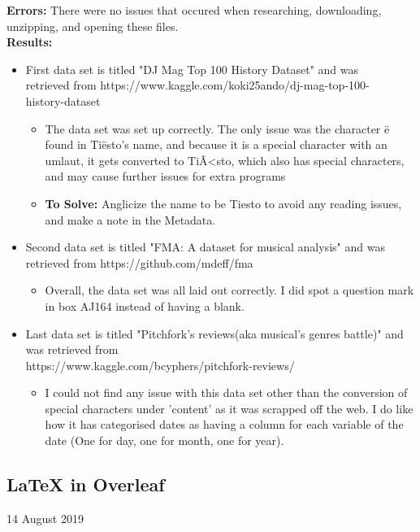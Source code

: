 \documentclass{article}
\begin{document}
\textbf{Errors:} There were no issues that occured when researching, downloading, unzipping, and opening these files. \\
\textbf{Results:}
\begin{itemize}
    \item First data set is titled "DJ Mag Top 100 History Dataset" and was \\ retrieved from https://www.kaggle.com/koki25ando/dj-mag-top-100-\\history-dataset
    \begin{itemize}
        \item  The data set was set up correctly. The only issue was the character ë found in Tiësto's name, and because it is a special character with an umlaut, it gets converted to TiÃ<sto, which also has special characters, and may cause further issues for extra programs
        \item \textbf{To Solve:} Anglicize the name to be Tiesto to avoid any reading issues, and make a note in the Metadata.
    \end{itemize}
    \item Second data set is titled "FMA: A dataset for musical analysis" and was retrieved from https://github.com/mdeff/fma
    \begin{itemize}
        \item Overall, the data set was all laid out correctly. I did spot a question mark in box AJ164 instead of having a blank.
    \end{itemize}
    \item Last data set is titled "Pitchfork's reviews(aka musical's genres battle)" and was retrieved from \\https://www.kaggle.com/bcyphers/pitchfork-reviews/
    \begin{itemize}
        \item I could not find any issue with this data set other than the conversion of special characters under 'content' as it was scrapped off the web. I do like how it has categorised dates as having a column for each variable of the date (One for day, one for month, one for year).
    \end{itemize}
\end{itemize}
\newpage
\begin{center}
\section*{LaTeX in Overleaf}
14 August 2019
\end{center}
\end{document}
